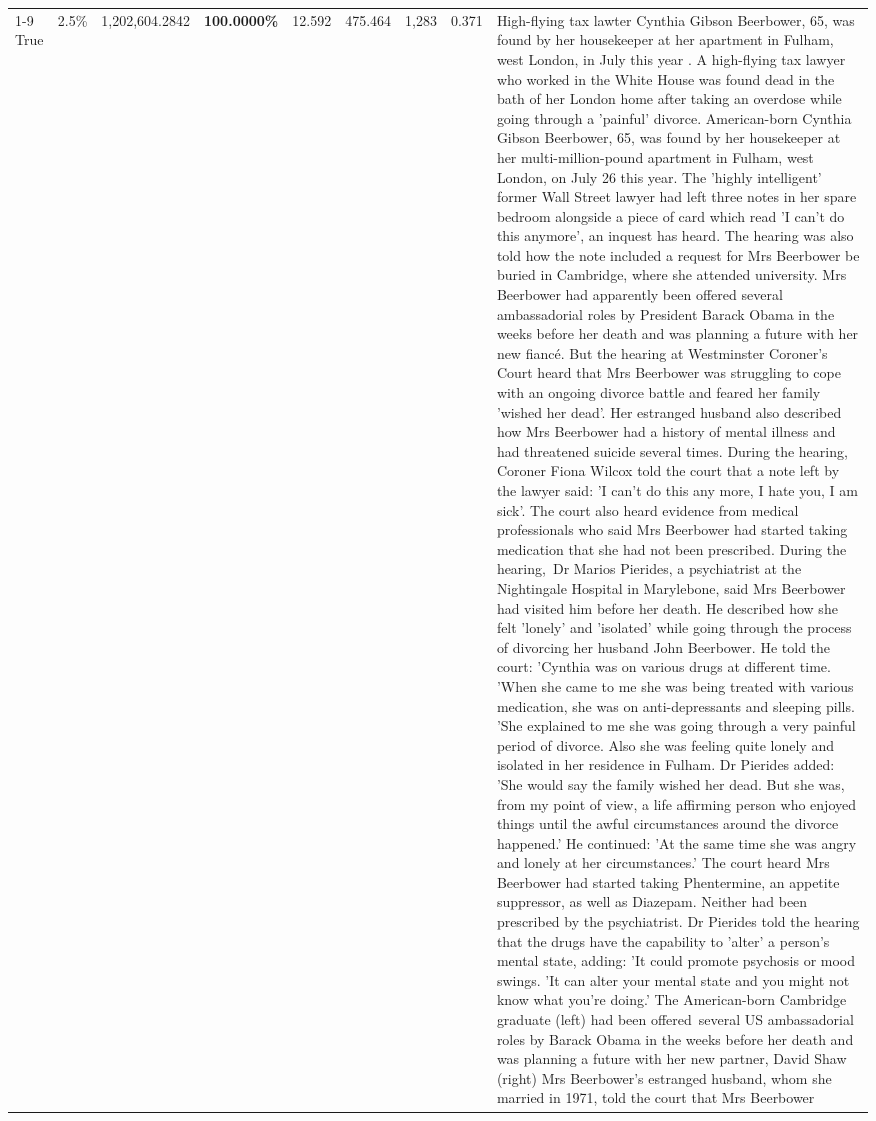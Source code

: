 \begin{table}[H]
\begin{tabular}{lllrlllll}
 \\
\cline{1-9}
True & 2.5\% & 1,202,604.2842 & \bfseries \color{red} 100.0000\% & 12.592 & 475.464 & 1,283 & 0.371 & High-flying tax lawter Cynthia Gibson Beerbower, 65, was found by her housekeeper at her apartment in Fulham, west London, in July this year . A high-flying tax lawyer who worked in the White House was found dead in the bath of her London home after taking an overdose while going through a 'painful' divorce. American-born Cynthia Gibson Beerbower, 65, was found by her housekeeper at her multi-million-pound apartment in Fulham, west London, on July 26 this year. The 'highly intelligent' former Wall Street lawyer had left three notes in her spare bedroom alongside a piece of card which read 'I can't do this anymore', an inquest has heard. The hearing was also told how the note included a request for Mrs Beerbower be buried in Cambridge, where she attended university. Mrs Beerbower had apparently been offered several ambassadorial roles by President Barack Obama in the weeks before her death and was planning a future with her new fiancé. But the hearing at Westminster Coroner's Court heard that Mrs Beerbower was struggling to cope with an ongoing divorce battle and feared her family 'wished her dead'. Her estranged husband also described how Mrs Beerbower had a history of mental illness and had threatened suicide several times. During the hearing, Coroner Fiona Wilcox told the court that a note left by the lawyer said: 'I can't do this any more, I hate you, I am sick'. The court also heard evidence from medical professionals who said Mrs Beerbower had started taking medication that she had not been prescribed. During the hearing, Dr Marios Pierides, a psychiatrist at the Nightingale Hospital in Marylebone, said Mrs Beerbower had visited him before her death. He described how she felt 'lonely' and 'isolated' while going through the process of divorcing her husband John Beerbower. He told the court: 'Cynthia was on various drugs at different time. 'When she came to me she was being treated with various medication, she was on anti-depressants and sleeping pills. 'She explained to me she was going through a very painful period of divorce. Also she was feeling quite lonely and isolated in her residence in Fulham. Dr Pierides added: 'She would say the family wished her dead. But she was, from my point of view, a life affirming person who enjoyed things until the awful circumstances around the divorce happened.' He continued: 'At the same time she was angry and lonely at her circumstances.' The court heard Mrs Beerbower had started taking Phentermine, an appetite suppressor, as well as Diazepam. Neither had been prescribed by the psychiatrist. Dr Pierides told the hearing that the drugs have the capability to 'alter' a person's mental state, adding: 'It could promote psychosis or mood swings. 'It can alter your mental state and you might not know what you're doing.' The American-born Cambridge graduate (left) had been offered several US ambassadorial roles by Barack Obama in the weeks before her death and was planning a future with her new partner, David Shaw (right) Mrs Beerbower's estranged husband, whom she married in 1971, told the court that Mrs Beerbower 
\end{tabular}
\end{table}
